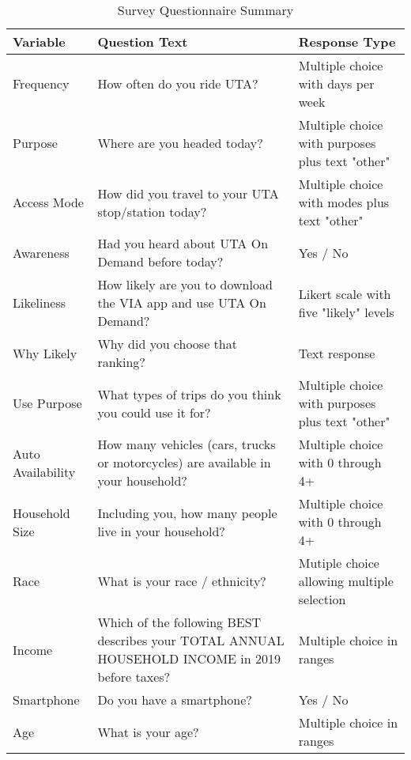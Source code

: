 \documentclass[smartcities,article,submit,moreauthors,pdftex]{Definitions/mdpi}
\begin{document}
\begin{table}[ht]
\renewcommand{\arraystretch}{1.5}
    \centering
    \caption{Survey Questionnaire Summary}
    \label{tab:survey-summary}
\begin{tabular}[t]{lp{}p{}}
\toprule
Variable & Question Text & Response Type\\
\midrule
Frequency & How often do you ride UTA? & Multiple choice with days per week\\
Purpose & Where are you headed today? & Multiple choice with purposes plus text "other"\\
Access Mode & How did you travel to your UTA stop/station today? & Multiple choice with modes plus text "other"\\
Awareness & Had you heard about UTA On Demand before today? & Yes / No\\
Likeliness & How likely are you to download the VIA app and use UTA On Demand? & Likert scale with five "likely" levels\\
\addlinespace
Why Likely & Why did you choose that ranking? & Text response\\
Use Purpose & What types of trips do you think you could use it for? & Multiple choice with purposes plus text "other"\\
Auto Availability & How many vehicles (cars, trucks or motorcycles) are available in your household? & Multiple choice with 0 through 4+\\
Household Size & Including you, how many people live in your household? & Multiple choice with 0 through 4+\\
Race & What is your race / ethnicity? & Mutiple choice allowing multiple selection\\
\addlinespace
Income & Which of the following BEST describes your TOTAL ANNUAL HOUSEHOLD INCOME in 2019 before taxes? & Multiple choice in ranges\\
Smartphone & Do you have a smartphone? & Yes / No\\
Age & What is your age? & Multiple choice in ranges\\
\bottomrule
\end{tabular}
\end{table}
\end{document}
